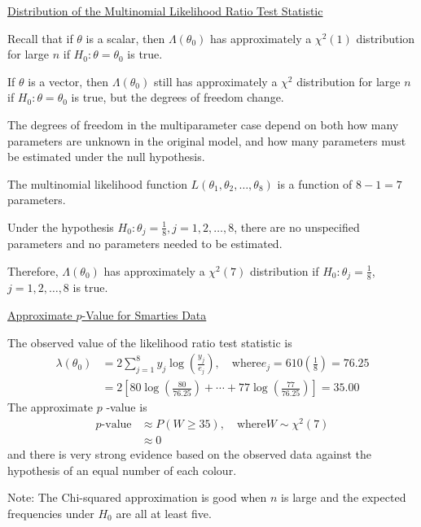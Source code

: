 \underline{Distribution of the Multinomial Likelihood Ratio Test Statistic}

Recall that if $\theta$ is a scalar, then $\Lambda\left(\theta_{0}\right)$ has approximately
a $\chi^{2}(1)$ distribution for large $n$ if $H_{0}: \theta=\theta_{0}$ is true.

If $\theta$ is a vector, then $\Lambda\left(\theta_{0}\right)$ still has approximately a $\chi^{2}$
distribution for large $n$ if $H_{0}: \theta=\theta_{0}$ is true, but the degrees of freedom change.

The degrees of freedom in the multiparameter case depend on both how many parameters are unknown in
the original model, and how many parameters must be estimated under the null hypothesis.


The multinomial likelihood function $L\left(\theta_{1}, \theta_{2}, \ldots, \theta_{8}\right)$ is
a function of $8-1=7$ parameters.

Under the hypothesis $H_{0}: \theta_{j}=\frac{1}{8}, j=1,2, \ldots, 8$, there are no
unspecified parameters and no parameters needed to be estimated.

Therefore, $\Lambda\left(\theta_{0}\right)$ has approximately a $\chi^{2}(7)$ distribution if
$H_{0}: \theta_{j}=\frac{1}{8} $, $ j=1,2, \ldots, 8$ is true.

\underline{Approximate $ p $-Value for Smarties Data}

The observed value of the likelihood ratio test statistic is
\[
    \begin{aligned}
        \lambda\left(\theta_{0}\right) & =2 \sum_{j=1}^{8} y_{j} \log \left(\frac{y_{j}}{e_{j}}\right), \quad \text{where} e_{j}=610\left(\frac{1}{8}\right)=76.25 \\
                                       & =2\left[80 \log \left(\frac{80}{76.25}\right)+\cdots+77 \log \left(\frac{77}{76.25}\right)\right]=35.00
    \end{aligned}
\]
The approximate $p$ -value is
\[
    \begin{aligned}
        p\text{-value}
         & \approx P(W \geq 35), \quad \text{where} W \sim \chi^{2}(7) \\
         & \approx 0
    \end{aligned}
\]
and there is very strong evidence based on the observed data against the hypothesis of
an equal number of each colour.

Note: The Chi-squared approximation is good when $n$ is large and the expected
frequencies under $H_{0}$ are all at least five.

